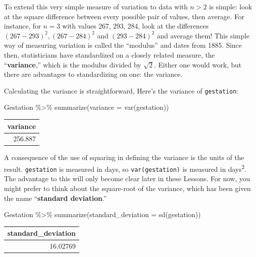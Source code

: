 \documentclass[
  letterpaper,
  DIV=11,
  numbers=noendperiod,
  oneside]{scrreprt}
\newenvironment{Shaded}{\begin{snugshade}}{\end{snugshade}}
\newcommand{\AttributeTok}[1]{\textcolor[rgb]{0.40,0.45,0.13}{#1}}
\newcommand{\FunctionTok}[1]{\textcolor[rgb]{0.28,0.35,0.67}{#1}}
\newcommand{\NormalTok}[1]{\textcolor[rgb]{0.00,0.23,0.31}{#1}}
\newcommand{\SpecialCharTok}[1]{\textcolor[rgb]{0.37,0.37,0.37}{#1}}
\begin{document}
To extend this very simple measure of variation to data with \(n > 2\)
is simple: look at the square difference between every possible pair of
values, then average. For instance, for \(n=3\) with values 267, 293,
284, look at the differences \((267-293)^2, (267-284)^2\) and
\((293-284)^2\) and average them! This simple way of measuring variation
is called the ``modulus'' and dates from 1885. Since then, statisticians
have standardized on a closely related measure, the
``\textbf{variance},'' which is the modulus divided by \(\sqrt{2}\).
Either one would work, but there are advantages to standardizing on one:
the variance.

Calculating the variance is straightforward, Here's the variance of
\texttt{gestation}:

\begin{Shaded}
\begin{Highlighting}[]
\NormalTok{Gestation }\SpecialCharTok{\%\textgreater{}\%}
  \FunctionTok{summarize}\NormalTok{(}\AttributeTok{variance =} \FunctionTok{var}\NormalTok{(gestation))}
\end{Highlighting}
\end{Shaded}

\ttfamily 
\begin{tabular}{r}
\toprule
variance\\
\midrule
256.887\\
\bottomrule
\end{tabular} \normalfont
\bigskip

A consequence of the use of squaring in defining the variance is the
units of the result. \texttt{gestation} is measured in days, so
\texttt{var(gestation)} is measured in days\textsuperscript{2}. The
advantage to this will only become clear later in these Lessons. For
now, you might prefer to think about the square-root of the variance,
which has been given the name ``\textbf{standard deviation}.''

\begin{Shaded}
\begin{Highlighting}[]
\NormalTok{Gestation }\SpecialCharTok{\%\textgreater{}\%}
  \FunctionTok{summarize}\NormalTok{(}\AttributeTok{standard\_deviation =} \FunctionTok{sd}\NormalTok{(gestation))}
\end{Highlighting}
\end{Shaded}

\ttfamily 
\begin{tabular}{r}
\toprule
standard\_deviation\\
\midrule
16.02769\\
\bottomrule
\end{tabular} \normalfont
\bigskip
\end{document}
